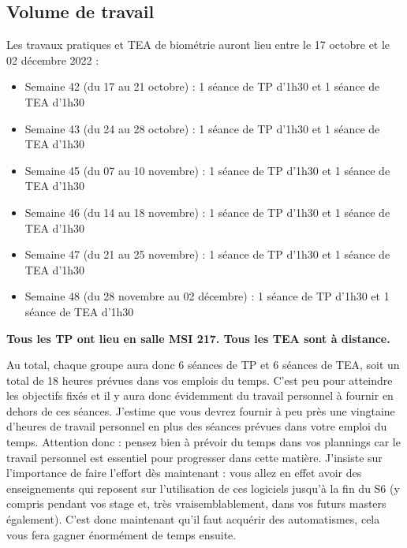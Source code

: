 \documentclass[
  a4paper,
  DIV=11,
  numbers=noendperiod,
  oneside]{scrreprt}
\providecommand{\tightlist}{%
  \setlength{\itemsep}{0pt}\setlength{\parskip}{0pt}}\usepackage{longtable,booktabs,array}
\begin{document}

\hypertarget{volume-de-travail}{%
\subsection*{Volume de travail}\label{volume-de-travail}}

Les travaux pratiques et TEA de biométrie auront lieu entre le 17
octobre et le 02 décembre 2022 :

\begin{itemize}
\tightlist
\item
  Semaine 42 (du 17 au 21 octobre) : 1 séance de TP d'1h30 et 1 séance
  de TEA d'1h30
\item
  Semaine 43 (du 24 au 28 octobre) : 1 séance de TP d'1h30 et 1 séance
  de TEA d'1h30
\item
  Semaine 45 (du 07 au 10 novembre) : 1 séance de TP d'1h30 et 1 séance
  de TEA d'1h30
\item
  Semaine 46 (du 14 au 18 novembre) : 1 séance de TP d'1h30 et 1 séance
  de TEA d'1h30
\item
  Semaine 47 (du 21 au 25 novembre) : 1 séance de TP d'1h30 et 1 séance
  de TEA d'1h30
\item
  Semaine 48 (du 28 novembre au 02 décembre) : 1 séance de TP d'1h30 et
  1 séance de TEA d'1h30
\end{itemize}

\textbf{Tous les TP ont lieu en salle MSI 217. Tous les TEA sont à
distance.}

Au total, chaque groupe aura donc 6 séances de TP et 6 séances de TEA,
soit un total de 18 heures prévues dans vos emplois du temps. C'est peu
pour atteindre les objectifs fixés et il y aura donc évidemment du
travail personnel à fournir en dehors de ces séances. J'estime que vous
devrez fournir à peu près une vingtaine d'heures de travail personnel en
plus des séances prévues dans votre emploi du temps. Attention donc :
pensez bien à prévoir du temps dans vos plannings car le travail
personnel est essentiel pour progresser dans cette matière. J'insiste
sur l'importance de faire l'effort dès maintenant : vous allez en effet
avoir des enseignements qui reposent sur l'utilisation de ces logiciels
jusqu'à la fin du S6 (y compris pendant vos stage et, très
vraisemblablement, dans vos futurs masters également). C'est donc
maintenant qu'il faut acquérir des automatismes, cela vous fera gagner
énormément de temps ensuite.
\end{document}
